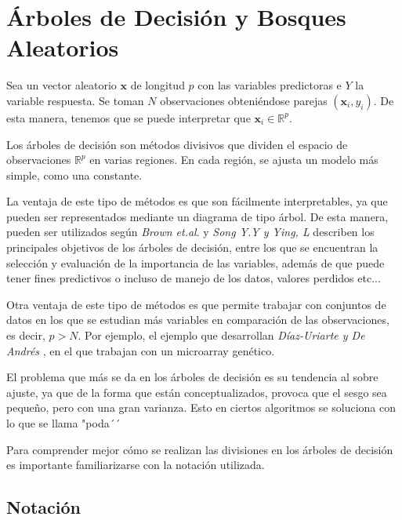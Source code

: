 \newpage
\section{ Árboles de Decisión y Bosques Aleatorios}
\noindent Sea un vector aleatorio $\textbf{x}$ de longitud $p$ con las variables predictoras e $Y$ la variable respuesta. Se toman $N$ observaciones obteniéndose parejas $(\textbf{x}_i,y_i)$. De esta manera, tenemos que se puede interpretar que $\mathbf{x}_i\in\mathbb{R}^p$.

\noindent Los árboles de decisión son métodos divisivos que dividen el espacio de observaciones $\mathbb{R}^p$ en varias regiones. En cada región, se ajusta un modelo más simple, como una constante.

\noindent La ventaja de este tipo de métodos es que son fácilmente interpretables, ya que pueden ser representados mediante un diagrama de tipo árbol. De esta manera, pueden ser utilizados según \textit{Brown et.al}.\cite{Brown 2004} y \emph{Song Y.Y y Ying, L} \cite{Song 2015} describen los principales objetivos de los árboles de decisión, entre los que se encuentran la selección y evaluación de la importancia de las variables, además de que puede tener fines predictivos o incluso de manejo de los datos, valores perdidos etc...

\noindent Otra ventaja de este tipo de métodos es que permite trabajar con conjuntos de datos en los que se estudian más variables en comparación de las observaciones, es decir, $p > N$. Por ejemplo, el ejemplo que desarrollan \textit{Díaz-Uriarte y De Andrés} \cite{Diaz 2006}, en el que trabajan con un microarray genético. 

\noindent El problema que más se da en los árboles de decisión es su tendencia al sobre ajuste, ya que de la forma que están conceptualizados, provoca que el sesgo sea pequeño, pero con una gran varianza. Esto en ciertos algoritmos se soluciona con lo que se llama "poda´´ 

\noindent Para comprender mejor cómo se realizan las divisiones en los árboles de decisión es importante familiarizarse con la notación utilizada.

\subsection*{Notación}

